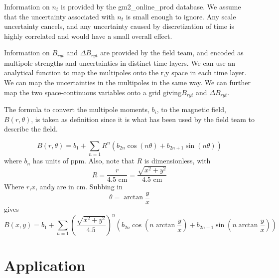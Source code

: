 \documentclass[twoside]{article}
\begin{document}
Information on $n_t$ is provided by the gm2\_online\_prod database. We assume that the uncertainty associated with $n_t$ is small enough to ignore. Any scale uncertainty cancels, and any uncertainty caused by discretization of time is highly correlated and would have a small overall effect.

Information on $B_{ryt}$ and $\Delta B_{ryt}$ are provided by the field team, and encoded as multipole strengths and uncertainties in distinct time layers.  We can use an analytical function to map the multipoles onto the {r,y} space in each time layer. We can map the uncertainties in the multipoles in the same way. We can further map the two space-continuous variables onto a grid giving$B_{ryt}$ and  $\Delta B_{ryt}$. 

The formula to convert the multipole moments, $b_i$, to the magnetic field, $B(r,\theta)$, is taken as definition since it is what has been used by the field team to describe the field.

\begin{equation}
B(r,\theta) =  b_1 +  \sum_{n=1} R^{n} (b_{2n} \cos(n \theta)  + b_{2n+1} \sin(n \theta )   )
\end{equation}
where $b_n$ has units of ppm. Also, note that $R$ is dimensionless, with 
\begin{equation}
R = \frac{r}{4.5 \text{ cm}}  = \frac{\sqrt{x^2 + y^2}}{4.5 \text{ cm}} 
\end{equation}
Where $r$,$x$, and$y$ are in cm. Subbing in 
\begin{equation}
\theta = \arctan \frac{y}{x}
\end{equation}
gives
\begin{equation}
B(x,y)  =  b_1 +  \sum_{n=1} (\frac{\sqrt{x^2 + y^2}}{4.5})^{n} (b_{2n} \cos(n \arctan \frac{y}{x})  + b_{2n+1} \sin(n  \arctan \frac{y}{x} )   )
\end{equation}



\newpage
\section{Application}
\end{document}
